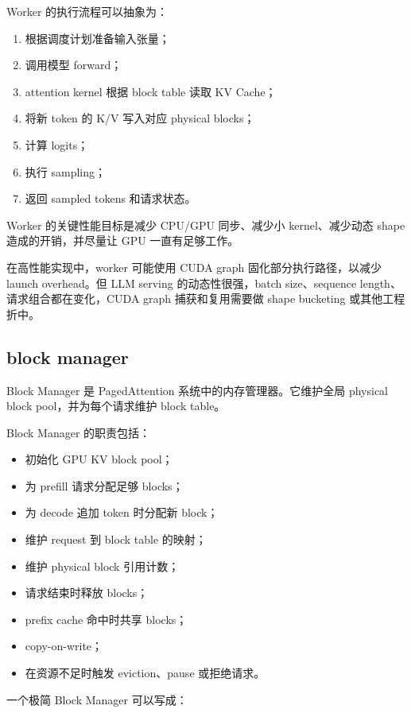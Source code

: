 Worker 的执行流程可以抽象为：

\begin{enumerate}
\item 根据调度计划准备输入张量；
\item 调用模型 forward；
\item attention kernel 根据 block table 读取 KV Cache；
\item 将新 token 的 K/V 写入对应 physical blocks；
\item 计算 logits；
\item 执行 sampling；
\item 返回 sampled tokens 和请求状态。
\end{enumerate}

Worker 的关键性能目标是减少 CPU/GPU 同步、减少小 kernel、减少动态 shape 造成的开销，并尽量让 GPU 一直有足够工作。

在高性能实现中，worker 可能使用 CUDA graph 固化部分执行路径，以减少 launch overhead。但 LLM serving 的动态性很强，batch size、sequence length、请求组合都在变化，CUDA graph 捕获和复用需要做 shape bucketing 或其他工程折中。

\subsection{block manager}
\label{subsec:vllm-block-manager}

Block Manager 是 PagedAttention 系统中的内存管理器。它维护全局 physical block pool，并为每个请求维护 block table。

Block Manager 的职责包括：

\begin{itemize}
\item 初始化 GPU KV block pool；
\item 为 prefill 请求分配足够 blocks；
\item 为 decode 追加 token 时分配新 block；
\item 维护 request 到 block table 的映射；
\item 维护 physical block 引用计数；
\item 请求结束时释放 blocks；
\item prefix cache 命中时共享 blocks；
\item copy-on-write；
\item 在资源不足时触发 eviction、pause 或拒绝请求。
\end{itemize}

一个极简 Block Manager 可以写成：

